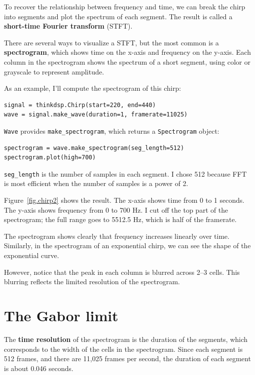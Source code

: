 \documentclass[12pt]{book}
\begin{document}
To recover the relationship between frequency and time, we can break
the chirp into segments and plot the spectrum of each segment.  The
result is called a {\bf short-time Fourier transform} (STFT).

There are several ways to visualize a STFT, but the most common
is a {\bf spectrogram}, which shows time on the x-axis and frequency
on the y-axis.  Each column in the spectrogram shows the spectrum of
a short segment, using color or grayscale to represent amplitude.

As an example, I'll compute the spectrogram of this chirp:

\begin{verbatim}
signal = thinkdsp.Chirp(start=220, end=440)
wave = signal.make_wave(duration=1, framerate=11025)
\end{verbatim}

{\tt Wave} provides \verb"make_spectrogram", which returns a
{\tt Spectrogram} object:

\begin{verbatim}
spectrogram = wave.make_spectrogram(seg_length=512)
spectrogram.plot(high=700)
\end{verbatim}

\verb"seg_length" is the number of samples in each segment.  I chose
512 because FFT is most efficient when the number of samples is a
power of 2.

Figure~\ref{fig.chirp2} shows the result.  The x-axis shows time from
0 to 1 seconds.  The y-axis shows frequency from 0 to 700 Hz.  I cut
off the top part of the spectrogram; the full range goes to 5512.5 Hz,
which is half of the framerate.

The spectrogram shows clearly that frequency increases linearly
over time.  Similarly, in the spectrogram of an exponential chirp, we
can see the shape of the exponential curve.

However, notice that the peak in each column is blurred across 2--3
cells.  This blurring reflects the limited resolution of the
spectrogram.


\section{The Gabor limit}
\label{gabor}

The {\bf time resolution} of the spectrogram is the duration of the
segments, which corresponds to the width of the cells in the
spectrogram.  Since each segment is 512 frames, and there are 11,025
frames per second, the duration of each segment is about 0.046 seconds.
\end{document}
